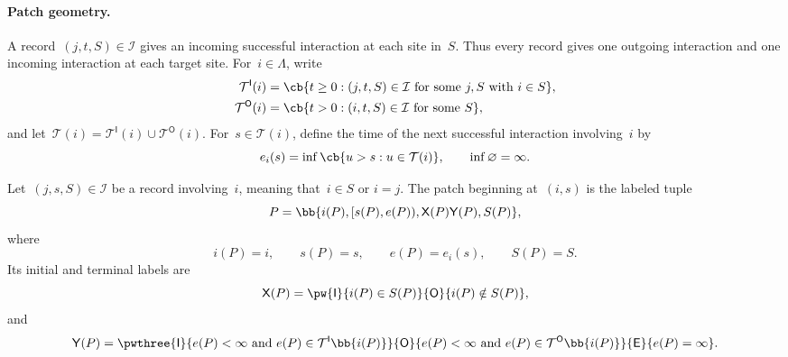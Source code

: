 \paragraph{Patch geometry.}
\label{subsec:patch-geometry}

A record~$(j,t,S)\in\mathcal I$ gives an incoming successful interaction at
each site in~$S$. Thus every record gives one outgoing interaction and
one incoming interaction at each target site. For~$i\in\Lambda$, write
\begin{align*}
\mathcal T^{\mathsf I}(i)
&=
\cb{t\geq0:(j,t,S)\in\mathcal I
  \text{ for some }j,S\text{ with }i\in S},
\\
\mathcal T^{\mathsf O}(i)
&=
\cb{t>0:(i,t,S)\in\mathcal I\text{ for some }S},
\end{align*}
and let~$\mathcal T(i)=\mathcal T^{\mathsf I}(i)\cup
\mathcal T^{\mathsf O}(i)$. For~$s\in\mathcal T(i)$, define the time of the
next successful interaction involving~$i$ by
\begin{equation*}
e_i(s)=\inf\cb{u>s:u\in\mathcal T(i)},
\qquad
\inf\varnothing=\infty.
\end{equation*}

\begin{definition}[Patch]
\label{def:patch}
Let~$(j,s,S)\in\mathcal I$ be a record involving~$i$, meaning that~$i\in S$ or
$i=j$. The patch beginning at~$(i,s)$ is the labeled tuple
\begin{equation*}
P=
\bb{i(P),[s(P),e(P)),\mathsf X(P)\mathsf Y(P),S(P)},
\end{equation*}
where
\begin{equation*}
i(P)=i,
\qquad
s(P)=s,
\qquad
e(P)=e_i(s),
\qquad
S(P)=S.
\end{equation*}
Its initial and terminal labels are
\begin{equation*}
\mathsf X(P)=
\pw{\mathsf I}{i(P)\in S(P)}{\mathsf O}{i(P)\notin S(P)},
\end{equation*}
and
\begin{equation*}
\mathsf Y(P)=
\pwthree
{\mathsf I}{e(P)<\infty\text{ and }e(P)\in\mathcal T^{\mathsf I}\bb{i(P)}}
{\mathsf O}{e(P)<\infty\text{ and }e(P)\in\mathcal T^{\mathsf O}\bb{i(P)}}
{\mathsf E}{e(P)=\infty}.
\end{equation*}
\end{definition}

